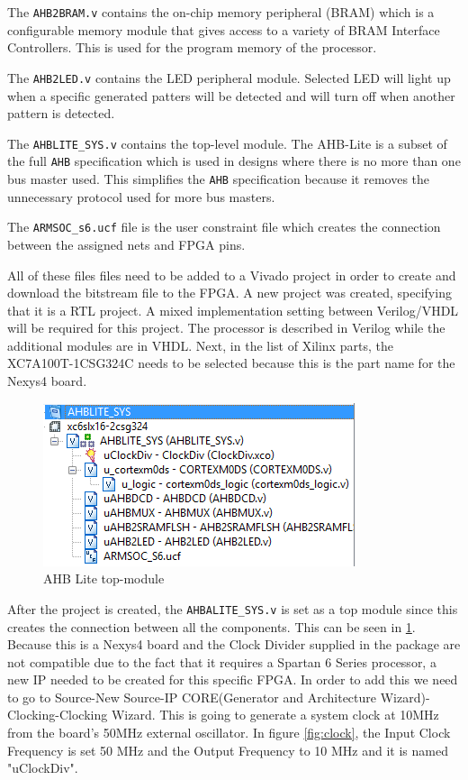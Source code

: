 The \verb|AHB2BRAM.v| contains the on-chip memory peripheral (BRAM) 
which is a configurable memory module that gives access to a variety of BRAM Interface Controllers. This is used for the program memory of the processor.

The \verb|AHB2LED.v| contains the LED peripheral module. Selected LED will light up when a specific generated patters will be detected and will turn off when another pattern is detected.

The \verb|AHBLITE_SYS.v| contains the top-level module. The AHB-Lite is a subset of the full \verb|AHB| specification which is used in designs where there is no more than one bus master used. This simplifies the \verb|AHB| specification because it removes the unnecessary protocol used for more bus masters.

The \verb|ARMSOC_s6.ucf| file is the user constraint file which creates the connection between the assigned nets and FPGA pins.

All of these files files need to be added to a Vivado project in order to create and download the bitstream file to the FPGA. A new project was created, specifying that it is a RTL project. A mixed implementation setting between Verilog/VHDL will be required for this project. The processor is described in Verilog while the additional modules are in VHDL. Next, in the list of Xilinx parts, the XC7A100T-1CSG324C needs to be selected because this is the part name for the Nexys4 board. 

\begin{figure}
\centering
\includegraphics[scale=0.7]{figures/AHBLITE_SYS_modules_ISE_schematic.PNG}
\caption{AHB Lite top-module } 
\label{fig:ahblite_sys}
\end{figure}

After the project is created, the \verb|AHBALITE_SYS.v| is set as a top module since this creates the connection between all the components. This can be seen in \ref{fig:ahblite_sys}. Because this is a Nexys4 board and the Clock Divider supplied in the package are not compatible due to the fact that it requires a Spartan 6 Series processor, a new IP needed to be created for this specific FPGA. In order to add this we need to go to Source-New Source-IP CORE(Generator and Architecture Wizard)-Clocking-Clocking Wizard. This is going to generate a system clock at 10MHz from the board's 50MHz external oscillator. In figure \ref{fig:clock}, the Input Clock Frequency is set 50 MHz and the Output Frequency to 10 MHz and it is named "uClockDiv".

